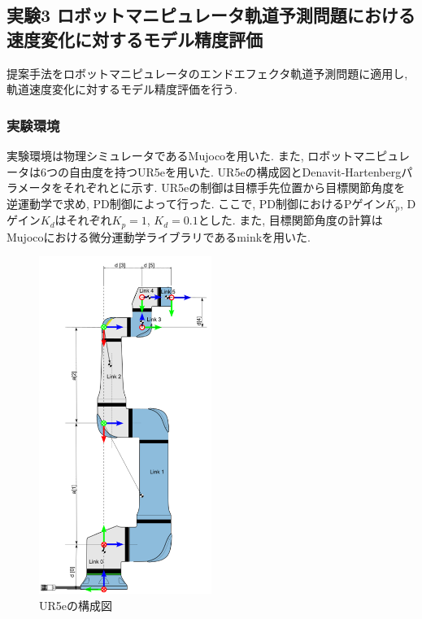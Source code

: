 \subsection{実験3 ロボットマニピュレータ軌道予測問題における速度変化に対するモデル精度評価}
提案手法をロボットマニピュレータのエンドエフェクタ軌道予測問題に適用し, 軌道速度変化に対するモデル精度評価を行う.

\subsubsection{実験環境}
実験環境は物理シミュレータであるMujoco\cite{mujoco}を用いた.
また, ロボットマニピュレータは6つの自由度を持つUR5eを用いた.
UR5eの構成図とDenavit-Hartenbergパラメータをそれぞれとに示す.
UR5eの制御は目標手先位置から目標関節角度を逆運動学で求め, PD制御によって行った.
ここで, PD制御におけるPゲイン$K_p$, Dゲイン$K_d$はそれぞれ$K_p=1$, $K_d=0.1$とした.
また, 目標関節角度の計算はMujocoにおける微分運動学ライブラリであるmink\cite{mink}を用いた.
\begin{figure}[htb]
    \centering
    \includegraphics[width=0.5\textwidth]{Static/ur5e_structure.png}
    \caption[UR5eの構成図]{
        UR5eの構成図\cite{ur5e}
    }
    \label{fig:ur5e:structure}
\end{figure}

